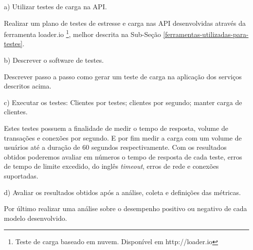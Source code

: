   \begin{compactitem}
    \item[a)] Utilizar testes de carga na \ac{API}.
    
    Realizar um plano de testes de estresse e carga nas \ac{API} desenvolvidas através
    da ferramenta loader.io \footnote{Teste de carga baseado em nuvem. Disponível em http://loader.io},
    melhor descrita na Sub-Seção \ref{ferramentas-utilizadas-para-testes}.
    
    
    \item[b)] Descrever o software de testes.
    
    Descrever passo a passo como gerar um teste de carga na aplicação dos serviços descritos acima.
    
    \item[c)] Executar os testes: Clientes por testes; clientes por segundo; manter carga de clientes.
    
    Estes testes possuem a finalidade de medir o tempo de resposta, volume de transações e conexões por segundo. E por fim
    medir a carga com um volume de usuários até a duração de 60 segundos respectivamente. 
    Com os resultados obtidos poderemos avaliar em números o tempo de resposta de cada teste,
    erros de tempo de limite excedido, do inglês \textit{timeout}, erros de rede e conexões suportadas. 
    
    \item[d)] Avaliar os resultados obtidos após a análise, coleta e definições das métricas.
    
    Por último realizar uma análise sobre o desempenho positivo ou negativo de cada modelo desenvolvido.
    
    
  \end{compactitem}



